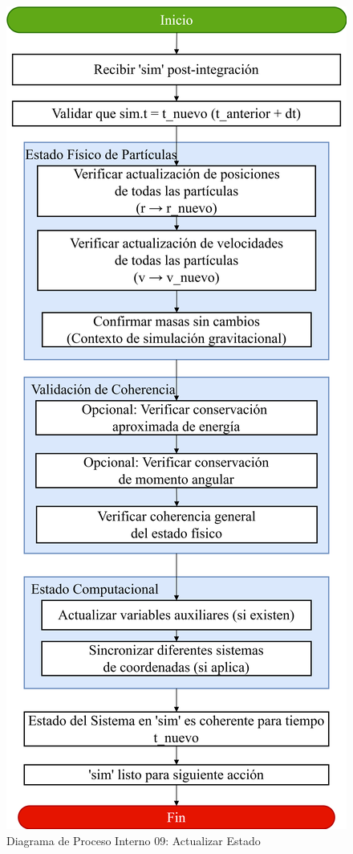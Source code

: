 \begin{figure}[H]
    \centering
    \includegraphics[width=\textwidth]{img/Analisis/DiagramaProcesos/DiagramaProceso09_ActualizarEstado.png}
    \caption{Diagrama de Proceso Interno 09: Actualizar Estado}%
    \label{fig:process_diagram09}
\end{figure}

